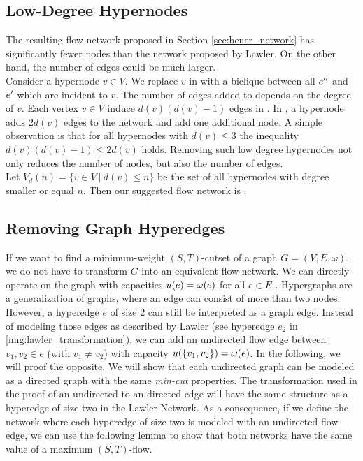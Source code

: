 \subsection{Low-Degree Hypernodes}
\label{sec:degree_network}

The resulting flow network  proposed in Section \ref{sec:heuer_network} has significantly
fewer nodes than the network  proposed by Lawler. On the other hand, the number of
edges could be much larger. \\
Consider a hypernode $v \in V$. We replace $v$ in  with a biclique between all
$e''$ and $e'$ which are incident to $v$. The number of edges added to  depends on the degree of
$v$. Each vertex $v \in V$ induce $d(v)(d(v) - 1)$ edges in . 
In , a hypernode adds $2d(v)$ edges to the network and add
one additional node. A simple observation is that for all hypernodes with $d(v) \le 3$ the inequality
$d(v)(d(v) - 1) \le 2d(v)$ holds. Removing such low degree hypernodes not only reduces
the number of nodes, but also the number of edges. \\
Let $V_{d}(n) = \{v \in V\ |\ d(v) \le n\}$ be the set of all hypernodes
with degree smaller or equal $n$. Then our suggested flow network is .

\subsection{Removing Graph Hyperedges}
\label{sec:edge_size_network}

If we want to find a minimum-weight $(S,T)$-cutset of a graph $G = (V,E,\omega)$, we do not have to transform
$G$ into an equivalent flow network. We can directly operate on the graph with capacities
$u(e) = \omega(e)$ for all $e \in E$ \cite{ford1956maximal}. Hypergraphs are a generalization of graphs, where
an edge can consist of more than two nodes. However, a hyperedge $e$ of size $2$ can still be 
interpreted as a graph edge. Instead of modeling those edges as described by Lawler \cite{lawler1973}
(see hyperedge $e_2$ in \autoref{img:lawler_transformation}), we can add an undirected 
flow edge between $v_1,v_2 \in e$ (with $v_1 \neq v_2$) with capacity $u(\{v_1,v_2\}) = \omega(e)$.
In the following, we will proof the opposite. We will show that each undirected graph can be modeled
as a directed graph with the same \emph{min-cut} properties. The transformation used in the proof
of an undirected to an directed edge will have the same structure as a hyperedge of size two
in the Lawler-Network. As a consequence, if we define the network where each hyperedge 
of size two is modeled with an undirected flow edge, we can use the following lemma to show
that both networks have the same value of a maximum $(S,T)$-flow.

